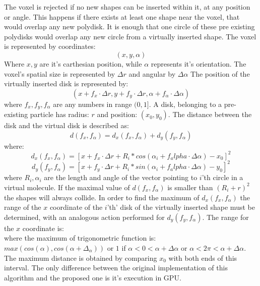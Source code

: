 \documentclass[12pt, oneside]{report}
\begin{document}
The voxel is rejected if no new shapes can be inserted within it, at any position or angle. This happens if there exists at least one shape near the voxel, that would overlap any new polydisk. It is enough that one circle of these pre existing polydisks would overlap any new circle from a virtually inserted shape.
The voxel is represented by coordinates:
\begin{equation*}
(x,y,\alpha)
\end{equation*}
Where $x,y$ are it's carthesian position, while $\alpha$ represents it's orientation. \newline
The voxel's spatial size is represented by $\Delta r$ and angular by $\Delta \alpha$ \newline
The position of the virtually inserted disk is represented by:
\begin{equation*}
(x+f_x \cdot \Delta r, y + f_y \cdot \Delta r, \alpha + f_{\alpha} \cdot \Delta \alpha)
\end{equation*}
where $f_x,f_y,f_{\alpha}$ are any numbers in range $(0,1]$. \newline
A disk, belonging to a pre-existing particle has radius: $r$ and position: $(x_0,y_0)$. The distance between the disk and the virtual disk is described as: \newline
\begin{equation*}
d(f_x,f_{\alpha})=d_x(f_x,f_{\alpha})+d_y(f_y,f_{\alpha})
\end{equation*}
where: \newline
\begin{equation*}
d_x(f_x,f_{\alpha})=[x+f_x \cdot \Delta r + R_i * cos(\alpha_i+f_alpha \cdot \Delta \alpha)-x_0]^2
\end{equation*}
\begin{equation*}
d_y(f_y,f_{\alpha})=[x+f_y \cdot \Delta r + R_i * sin(\alpha_i+f_alpha \cdot \Delta \alpha)-y_0]^2
\end{equation*}
where $R_i, \alpha_i$ are the length and angle of the vector pointing to $i$'th circle in a virtual molecule. \newline
If the maximal value of $d(f_x,f_{\alpha})$ is smaller than $(R_i + r)^2$ the shapes will always collide. \newline
In order to find the maximum of $d_x(f_x,f_{\alpha})$ the range of the $x$ coordinate of the $i$'th' disk of the virtually inserted shape must be determined, with an analogous action performed for $d_y(f_y,f_{\alpha})$. The range for the $x$ coordinate is:
\begin{equation*}
[x + R_i \cdot \min_{f_{\alpha} \in [0,1)} cos(\alpha_i + f_{\alpha} \cdot \Delta \alpha), x + \Delta r + R_i \cdot \max_{f_{\alpha} \in [0,1)} cos(\alpha_i + f_{\alpha} \cdot \Delta \alpha)]
\end{equation*}
where the maximum of trigonometric function is: $max (cos(\alpha), cos(\alpha + \Delta_{\alpha})) $ or
$1$ if $ \alpha<0<\alpha + \Delta \alpha $ or $ \alpha< 2 \pi <\alpha + \Delta \alpha$.
The maximum distance is obtained by comparing $x_0$ with both ends of this interval. \newline
The only difference between the original implementation of this algorithm and the proposed one is it's execution in GPU.
\end{document}
